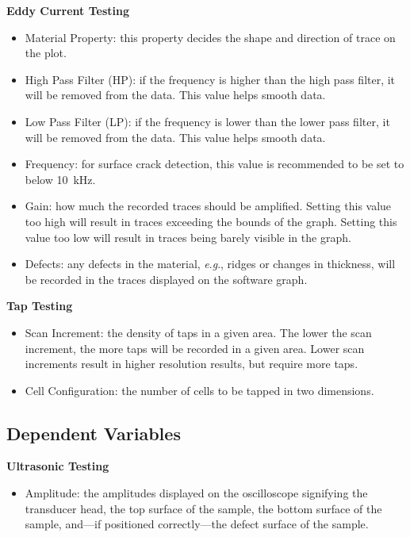 \documentclass[12 pt]{report}
\newcommand{\eg}{\textit{e}.\textit{g}., }
\begin{document}
\textbf{Eddy Current Testing}

\begin{itemize}
	\item Material Property: this property decides the shape and direction of trace on the plot.
	\item High Pass Filter (HP): if the frequency is higher than the high pass filter, it will be removed from the data. This value helps smooth data.
	\item Low Pass Filter (LP): if the frequency is lower than the lower pass filter, it will be removed from the data. This value helps smooth data.
	\item Frequency: for surface crack detection, this value is recommended to be set to below \qty{10}{\kilo\hertz}.
	\item Gain: how much the recorded traces should be amplified. Setting this value too high will result in traces exceeding the bounds of the graph. Setting this value too low will result in traces being barely visible in the graph.
	\item Defects: any defects in the material, \eg ridges or changes in thickness, will be recorded in the traces displayed on the software graph.
\end{itemize}

\textbf{Tap Testing}

\begin{itemize}
	\item Scan Increment: the density of taps in a given area. The lower the scan increment, the more taps will be recorded in a given area. Lower scan increments result in higher resolution results, but require more taps.
	\item Cell Configuration: the number of cells to be tapped in two dimensions.
\end{itemize}

\subsection{Dependent Variables} \label{variables-dependent_variables}
\textbf{Ultrasonic Testing}

\begin{itemize}
	\item Amplitude: the amplitudes displayed on the oscilloscope signifying the transducer head, the top surface of the sample, the bottom surface of the sample, and---if positioned correctly---the defect surface of the sample.
\end{itemize} 
\end{document}
